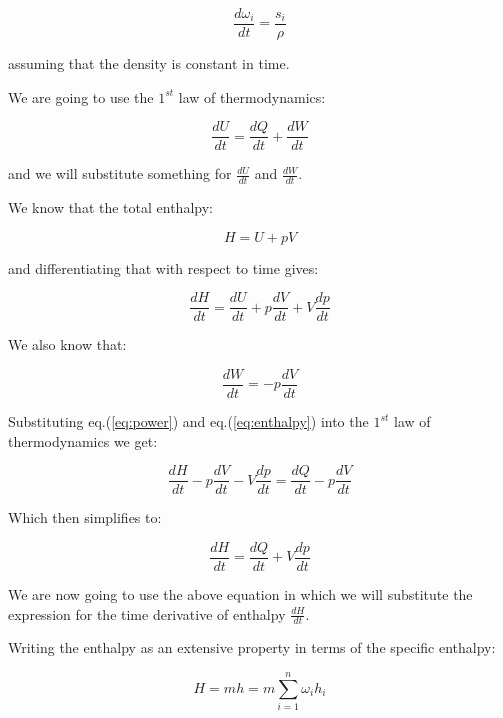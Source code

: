 \documentclass[10pt]{article}
\begin{document}
\begin{equation} \label{eq:batch-reactor-species-mass}
\frac{d \omega_i}{dt} = \frac{s_i}{\rho}
\end{equation}

assuming that the density is constant in time.

We are going to use the $1^{st}$ law of thermodynamics:

\begin{equation}
\frac{dU}{dt} = \frac{dQ}{dt} + \frac{dW}{dt}
\end{equation}

and we will substitute something for $\frac{dU}{dt}$ and $\frac{dW}{dt}$.

We know that the total enthalpy:

\begin{equation}
H = U + p V
\end{equation}

and differentiating that with respect to time gives:

\begin{equation} \label{eq:enthalpy}
\frac{d H}{dt} = \frac{dU}{dt} + p \frac{dV}{dt} + V \frac{dp}{dt}
\end{equation}

We also know that:

\begin{equation} \label{eq:power}
\frac{dW}{dt} = -p \frac{dV}{dt}
\end{equation}


Substituting eq.(\ref{eq:power}) and eq.(\ref{eq:enthalpy}) into the $1^{st}$ law of thermodynamics we get:

\begin{equation}
\frac{dH}{dt} - p \frac{dV}{dt} - V \frac{dp}{dt} = \frac{dQ}{dt} -p \frac{dV}{dt}
\end{equation}

Which then simplifies to:

\begin{equation} \label{eq:enthalpy-from-1st-law}
\frac{dH}{dt}  = \frac{dQ}{dt} + V \frac{dp}{dt}
\end{equation}

We are now going to use the above equation in which we will substitute the expression for the time derivative of enthalpy $\frac{dH}{dt}$.

Writing the enthalpy as an extensive property in terms of the specific enthalpy:

\begin{equation}
H = m h = m \sum_{i=1}^n \omega_i h_i
\end{equation}
\end{document}
